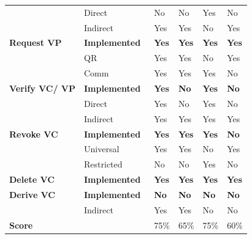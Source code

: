 \begin{table}[htp!]
\begin{threeparttable}
\begin{tabular}{llllll}
                                    & Direct                & No              & No                & Yes              & No               \\
                                    & Indirect              & Yes             & Yes               & No\tnote{2}             & Yes              \\
            \textbf{Request VP }    & \textbf{Implemented}  & \textbf{Yes }   & \textbf{Yes }     & \textbf{Yes }    & \textbf{Yes }    \\
                                    & QR                    & Yes             & Yes               & No\tnote{2}             & Yes              \\
                                    & Comm                  & Yes\tnote{1}            & Yes\tnote{1}              & Yes              & No               \\
            \textbf{Verify VC/ VP } & \textbf{Implemented}  & \textbf{Yes }   & \textbf{No}       & \textbf{Yes\tnote{3}}  & \textbf{No}      \\
                                    & Direct                & Yes             & No                & Yes\tnote{3}           & No               \\
                                    & Indirect              & Yes             & Yes               & Yes\tnote{3}          & Yes              \\
            \textbf{Revoke VC}      & \textbf{Implemented}  & \textbf{Yes }   & \textbf{Yes }     & \textbf{Yes\tnote{3}}  & \textbf{No}      \\
                                    & Universal             & Yes             & Yes               & No               & Yes              \\
                                    & Restricted            & No              & No                & Yes\tnote{3}           & No               \\
            \textbf{Delete VC}      & \textbf{Implemented~} & \textbf{Yes }   & \textbf{Yes }     & \textbf{Yes }    & \textbf{Yes }    \\
            \textbf{Derive VC}      & \textbf{Implemented~} & \textbf{No }    & \textbf{No }      & \textbf{No }     & \textbf{No }     \\
                                    & Indirect              & Yes             & Yes               & No               & No               \\
            \hline
            \textbf{Score} &  & 75\% & 65\% & 75\% & 60\%\\

\end{tabular}
\end{threeparttable}
\end{table}
